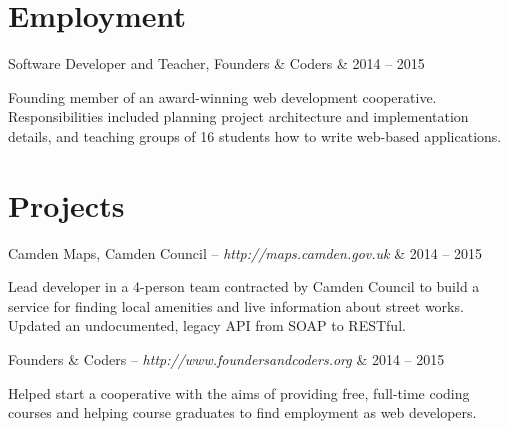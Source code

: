 \documentclass[letterpaper]{article}
\begin{document}
\section*{Employment}
 
\begin{list1}
  \item \begin{tabular1bold} Software Developer and Teacher, Founders \& Coders & 2014 -- 2015 \end{tabular1bold}
  
  \begin{list2} 
    Founding member of an award-winning web development cooperative. Responsibilities included planning project architecture and implementation details, and teaching groups of 16 students how to write web-based applications.
  \end{list2} 
  
\end{list1}

\section*{Projects}
\begin{list1}
  \item \begin{tabular1bold} Camden Maps, Camden Council -- \emph{http://maps.camden.gov.uk} & 2014 -- 2015 \end{tabular1bold}
  
  \begin{list2} 
    Lead developer in a 4-person team contracted by Camden Council to build a service for finding local amenities and live information about street works. Updated an undocumented, legacy API from SOAP to RESTful. 
  \end{list2} 
  
  \item \begin{tabular1bold} Founders \& Coders -- \emph{http://www.foundersandcoders.org} & 2014 -- 2015 \end{tabular1bold}
  
  \begin{list2} 
    Helped start a cooperative with the aims of providing free, full-time coding courses and helping course graduates to find employment as web developers. 
  \end{list2} 
  
\end{list1}
\end{document}
